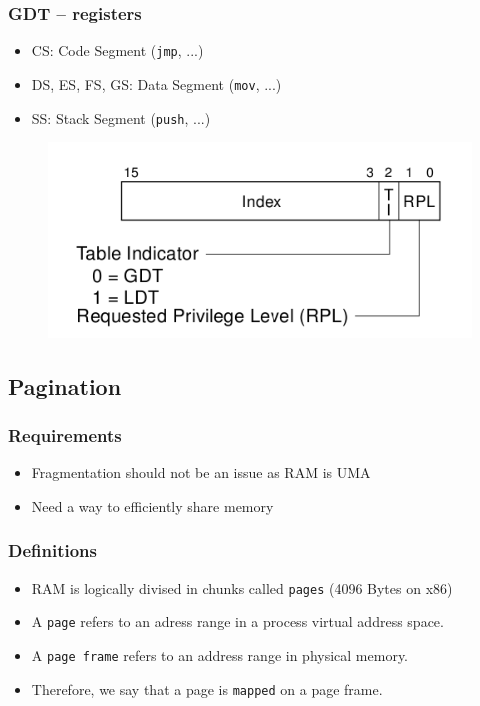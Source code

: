 \documentclass{beamer}
\begin{document}
\begin{frame}
  \frametitle{GDT -- registers}

  \begin{itemize}
  \item
    CS: Code Segment (\texttt{jmp}, ...)
  \item
    DS, ES, FS, GS: Data Segment (\texttt{mov}, ...)
  \item
    SS: Stack Segment (\texttt{push}, ...)
  \end{itemize}
  \begin{figure}
  \includegraphics[scale=0.5]{segreg.png}
  \end{figure}
\end{frame}

\subsection{Pagination}

\begin{frame}
  \frametitle{Requirements}

  \begin{itemize}
  \item
    Fragmentation should not be an issue as RAM is UMA
  \item
    Need a way to efficiently share memory
  \end{itemize}
\end{frame}

\begin{frame}
  \frametitle{Definitions}

  \begin{itemize}
  \item
    RAM is logically divised in chunks called \texttt{pages} (4096 Bytes on x86)
  \item
    A \texttt{page} refers to an adress range in a process virtual address space.
  \item
    A \texttt{page frame} refers to an address range in physical memory.
  \item
    Therefore, we say that a page is \texttt{mapped} on a page frame.
  \end{itemize}
\end{frame}
\end{document}
